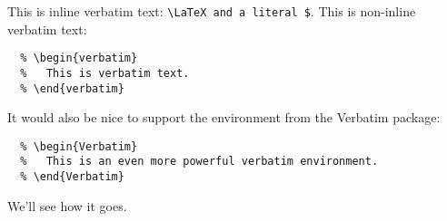 This is inline verbatim text: \verb+\LaTeX and a literal $+. This is non-inline verbatim text:
\begin{verbatim}
  % \begin{verbatim}
  %   This is verbatim text.
  % \end{verbatim}
\end{verbatim}
It would also be nice to support the environment from the Verbatim package:
\begin{Verbatim}
  % \begin{Verbatim}
  %   This is an even more powerful verbatim environment.
  % \end{Verbatim}
\end{Verbatim}
We'll see how it goes.